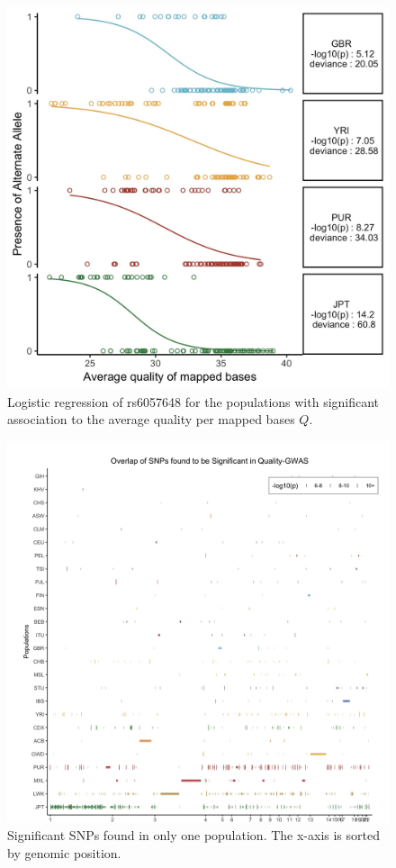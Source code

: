 \documentclass[9pt,lineno]{elife}
\begin{document}
\begin{figure}[h]
\includegraphics[width=\hsize,keepaspectratio]{./Figures/RegressionPlot.jpg}
\caption{Logistic regression of rs6057648 for the populations with significant association to the average quality per mapped bases $Q$.}
\label{TwinsSNP}
\end{figure}

\begin{figure}[h]
\includegraphics[width=\hsize,keepaspectratio]{./Figures/SNP6_Singles.jpg}
\caption{Significant SNPs found in only one population. The x-axis is sorted by genomic position.}
\label{Singles}
\end{figure}
\end{document}
